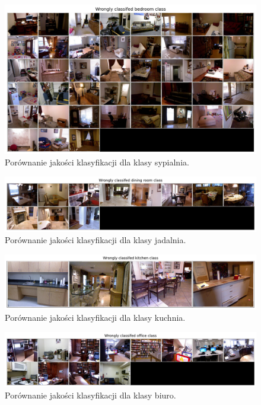 \begin{figure}[ht!]
    \centering
    \includegraphics[width=\textwidth]{img/preds_analysis/classification/bedroom.png}
    \caption{Porównanie jakości klasyfikacji dla klasy sypialnia.}
    \label{fig:bedroom-false-pred}
\end{figure}
\begin{figure}[ht!]
    \centering
    \includegraphics[width=\textwidth]{img/preds_analysis/classification/dining_room.png}
    \caption{Porównanie jakości klasyfikacji dla klasy jadalnia.}
    \label{fig:dining_room-false-pred}
\end{figure}
\begin{figure}[ht!]
    \centering
    \includegraphics[width=\textwidth]{img/preds_analysis/classification/kitchen.png}
    \caption{Porównanie jakości klasyfikacji dla klasy kuchnia.}
    \label{fig:kitchen-false-pred}
\end{figure}
\begin{figure}[ht!]
    \centering
    \includegraphics[width=\textwidth]{img/preds_analysis/classification/office.png}
    \caption{Porównanie jakości klasyfikacji dla klasy biuro.}
    \label{fig:office-false-pred}
\end{figure}
